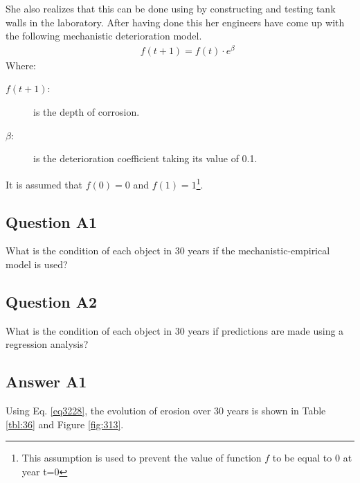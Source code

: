 She also realizes that this can be done using by constructing and testing tank walls in the laboratory. After having done this her engineers have come up with the following mechanistic deterioration model.
\begin{eqnarray}
 && f(t + 1) = f(t) \cdot {e^\beta }\label{eq3228}
\end{eqnarray}
Where:
\begin{adjustwidth}{1cm}{}
\begin{description}
\item[$f(t+1)$:] is the depth of corrosion.
\item[$\beta$:] is the deterioration coefficient taking its value of 0.1.
\end{description}
\end{adjustwidth}
It is assumed that $f(0) = 0$ and $f(1) = 1$\footnote{This assumption is used to prevent the value of function $f$ to be equal to 0 at year t=0}.

\subsection{Question A1}
What is the condition of each object in 30 years if the mechanistic-empirical model is used?
\subsection{Question A2}
What is the condition of each object in 30 years if predictions are made using a regression analysis?
\subsection{Answer A1}
Using Eq. \eqref{eq3228}, the evolution of erosion over 30 years is shown in Table \ref{tbl:36} and Figure \ref{fig:313}. 

